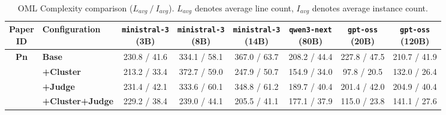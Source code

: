 \begin{table}[htbp]
    \centering
    \small
    \setlength{\tabcolsep}{4pt}
    \caption{OML Complexity comparison ($L_{avg}~/~I_{avg}$). $L_{avg}$ denotes average line count, $I_{avg}$ denotes average instance count.}
    \begin{tabular}{c|l|cccccc}
        \hline
        \makecell{\textbf{Paper} \\ \textbf{ID}} & \textbf{Configuration} & \makecell{\texttt{ministral-3} \\ (3B)} & \makecell{\texttt{ministral-3} \\ (8B)} & \makecell{\texttt{ministral-3} \\ (14B)} & \makecell{\texttt{qwen3-next} \\ (80B)} & \makecell{\texttt{gpt-oss} \\ (20B)} & \makecell{\texttt{gpt-oss} \\ (120B)} \\
        \hline
        
        \multirow{4}{*}{\textbf{Pn}} 
          & \textbf{Base} & 230.8 / 41.6 & 334.1 / 58.1 & 367.0 / 63.7 & 208.2 / 44.4 & 227.8 / 47.5 & 210.7 / 41.9\\
          & \textbf{+Cluster} & 213.2 / 33.4 & 372.7 / 59.0 & 247.9 / 50.7 & 154.9 / 34.0 & 97.8 / 20.5 & 132.0 / 26.4\\
          & \textbf{+Judge} & 231.4 / 42.1 & 333.6 / 60.1 & 348.8 / 61.2 & 189.7 / 40.4 & 201.4 / 42.0 & 204.9 / 40.4\\
          & \textbf{+Cluster+Judge} & 229.2 / 38.4 & 239.0 / 44.1 & 205.5 / 41.1 & 177.1 / 37.9 & 115.0 / 23.8 & 141.1 / 27.6\\
        \hline
        
    \end{tabular}
    \label{tab:complexity_pn}
\end{table}